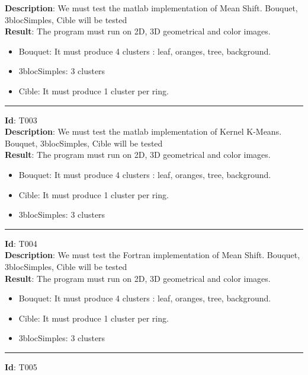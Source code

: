 \textbf{Description}: We must test the matlab implementation of Mean Shift. Bouquet, 3blocSimples, Cible will be tested\\

\textbf{Result}: The program must run on 2D, 3D geometrical and color images.
\begin{itemize}
\item Bouquet: It must produce 4 clusters : leaf, oranges, tree, background.
\item 3blocSimples: 3 clusters
\item Cible: It must produce 1 cluster per ring.\\
\end{itemize}
\hrule
\vspace{0.2cm}
\textbf{Id}: T003\\

\textbf{Description}: We must test the matlab implementation of Kernel K-Means. Bouquet, 3blocSimples, Cible will be tested\\

\textbf{Result}: The program must run on 2D, 3D geometrical and color images.
\begin{itemize}
\item Bouquet: It must produce 4 clusters : leaf, oranges, tree, background.
\item Cible: It must produce 1 cluster per ring.
\item 3blocSimples: 3 clusters\\
\end{itemize}
\hrule
\vspace{0.2cm}
\textbf{Id}: T004\\

\textbf{Description}: We must test the Fortran implementation of Mean Shift. Bouquet, 3blocSimples, Cible will be tested\\

\textbf{Result}: The program must run on 2D, 3D geometrical and color images.
\begin{itemize}
\item Bouquet: It must produce 4 clusters : leaf, oranges, tree, background.
\item Cible: It must produce 1 cluster per ring.
\item 3blocSimples: 3 clusters\\
\end{itemize}
\hrule
\vspace{0.2cm}
\textbf{Id}: T005\\

